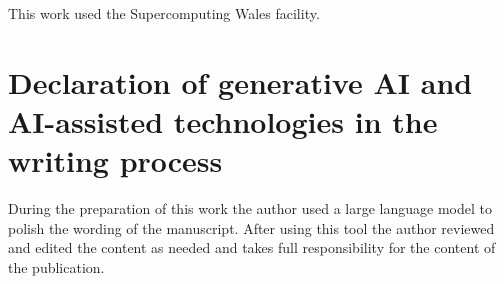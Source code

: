 \documentclass[preprint,12pt]{elsarticle}
\begin{document}
This work used the Supercomputing Wales facility.

\section*{Declaration of generative AI and AI-assisted technologies in the
writing process}

During the preparation of this work the author used a large language model to
polish the wording of the manuscript. After using this tool the author reviewed
and edited the content as needed and takes full responsibility for the content
of the publication.



\end{document}
